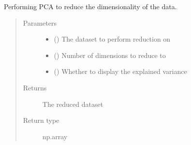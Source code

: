 \documentclass[letterpaper,10pt,english]{sphinxmanual}
\begin{document}

\begin{fulllineitems}
\label{\detokenize{preprocessing:Foresight.preprocessing.dimension_reduce}}
Performing PCA to reduce the dimensionality of the data.
\begin{quote}\begin{description}
\item[{Parameters}] \leavevmode\begin{itemize}
\item {} 
 () \textendash{} The dataset to perform reduction on

\item {} 
 () \textendash{} Number of dimensions to reduce to

\item {} 
 () \textendash{} Whether to display the explained variance

\end{itemize}

\item[{Returns}] \leavevmode
The reduced dataset

\item[{Return type}] \leavevmode
np.array

\end{description}\end{quote}

\end{fulllineitems}

\end{document}
